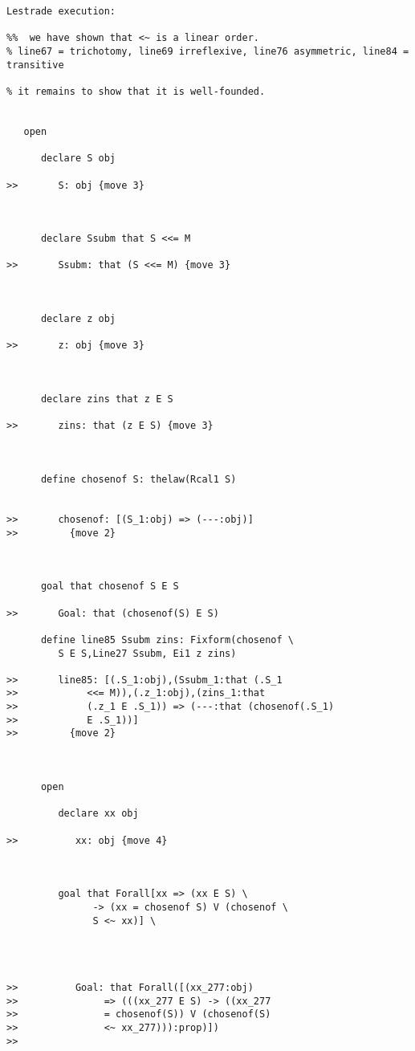 \documentclass[12pt]{article}
\begin{document}
\begin{verbatim}Lestrade execution:

%%  we have shown that <~ is a linear order. 
% line67 = trichotomy, line69 irreflexive, line76 asymmetric, line84 = transitive

% it remains to show that it is well-founded.


   open

      declare S obj

>>       S: obj {move 3}



      declare Ssubm that S <<= M

>>       Ssubm: that (S <<= M) {move 3}



      declare z obj

>>       z: obj {move 3}



      declare zins that z E S

>>       zins: that (z E S) {move 3}



      define chosenof S: thelaw(Rcal1 S)


>>       chosenof: [(S_1:obj) => (---:obj)]
>>         {move 2}



      goal that chosenof S E S

>>       Goal: that (chosenof(S) E S)

      define line85 Ssubm zins: Fixform(chosenof \
         S E S,Line27 Ssubm, Ei1 z zins)

>>       line85: [(.S_1:obj),(Ssubm_1:that (.S_1
>>            <<= M)),(.z_1:obj),(zins_1:that
>>            (.z_1 E .S_1)) => (---:that (chosenof(.S_1)
>>            E .S_1))]
>>         {move 2}



      open

         declare xx obj

>>          xx: obj {move 4}



         goal that Forall[xx => (xx E S) \
               -> (xx = chosenof S) V (chosenof \
               S <~ xx)] \
            



>>          Goal: that Forall([(xx_277:obj)
>>               => (((xx_277 E S) -> ((xx_277
>>               = chosenof(S)) V (chosenof(S)
>>               <~ xx_277))):prop)])
>>            


\end{verbatim}
\end{document}
